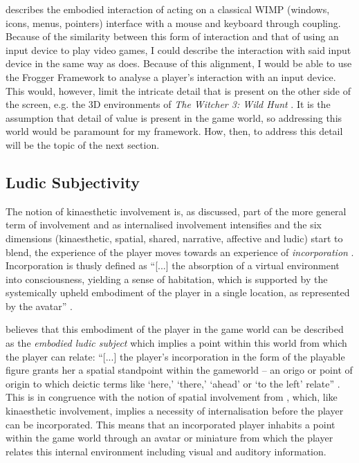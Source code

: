  describes the embodied interaction of acting on a classical WIMP (windows, icons, menus, pointers) interface with a mouse and keyboard through coupling. Because of the similarity between this form of interaction and that of using an input device to play video games, I could describe the interaction with said input device in the same way as  does. Because of this alignment, I would be able to use the Frogger Framework \cite{frogger} to analyse a player's interaction with an input device. This would, however, limit the intricate detail that is present on the other side of the screen, e.g. the 3D environments of \textit{The Witcher 3: Wild Hunt} \cite{witcher}. It is the assumption that detail of value is present in the game world, so addressing this world would be paramount for my framework. How, then, to address this detail will be the topic of the next section.

\subsection{Ludic Subjectivity}
The notion of kinaesthetic involvement is, as discussed, part of the more general term of involvement and as internalised involvement intensifies and the six dimensions (kinaesthetic, spatial, shared, narrative, affective and ludic) start to blend, the experience of the player moves towards an experience of \textit{incorporation} \cite{calleja}. Incorporation is thusly defined as ``[...] the absorption of a virtual environment into consciousness, yielding a sense of habitation, which is supported by the systemically upheld embodiment of the player in a single location, as represented by the avatar'' \cite[p. 169]{calleja}.

 believes that this embodiment of the player in the game world can be described as the \textit{embodied ludic subject} which implies a point within this world from which the player can relate: ``[...] the player’s incorporation in the form of the playable figure grants her a spatial standpoint within the gameworld – an origo or point of origin to which deictic terms like ‘here,’ ‘there,’ ‘ahead’ or ‘to the left’ relate'' \cite[p. 4]{vellashort}. This is in congruence with the notion of spatial involvement from , which, like kinaesthetic involvement, implies a necessity of internalisation before the player can be incorporated. This means that an incorporated player inhabits a point within the game world through an avatar or miniature from which the player relates this internal environment including visual and auditory information.

